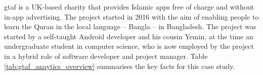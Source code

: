  
\Acrfull{gtaf} is a UK-based charity that provides Islamic apps free of charge and without in-app advertising. The project started in 2016 with the aim of enabling people to learn the Quran in the local language -- Bangla -- in Bangladesh. The project was started by a self-taught Android developer and his cousin Yemin, at the time an undergraduate student in computer science, who is now employed by the project in a hybrid role of software developer and project manager. Table \ref{tab:gtaf_anaytics_overview} summarises the key facts for this case study.

{\renewcommand{\arraystretch}{0.8}%
\begin{table*}[h]
    

\end{table*}}
